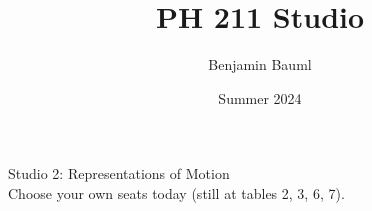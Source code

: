 \documentclass[]{article}
\title{PH 211 Studio \Week}
\author{Benjamin Bauml}
\date{Summer 2024}
\begin{document}
\begin{TeacherMargin}

\end{TeacherMargin}
\begin{PresentSpace}
\begin{center}
	\huge Studio 2: Representations of Motion \\
	\vspace{1cm}
	\LARGE Choose your own seats today (still at tables 2, 3, 6, 7).
\end{center}
\begin{comment}{2}
\begin{enumerate}[(A)]
	\item Velocity is acceleration times $t$.
	\vspace{6pt}
	\item Acceleration is velocity times $t$.
	\vspace{15pt}
	\item Acceleration is the derivative of velocity.
	\item Velocity is the derivative of acceleration.
\end{enumerate}
\end{comment}
\end{PresentSpace}
\newpage
\end{document}
